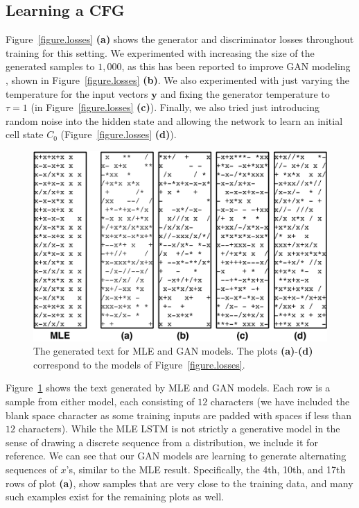 \subsection*{Learning a CFG}
Figure~\ref{figure.losses} \textbf{(a)} shows the generator and discriminator losses throughout training for this setting. We experimented with increasing the size of the generated samples to $1,000$, as this has been reported to improve GAN modeling \cite{huszar2015not}, shown in Figure~\ref{figure.losses} \textbf{(b)}. We also experimented with just varying the temperature for the input vectors $\mathbf{y}$ and fixing the generator temperature to $\tau\!=\!1$ (in Figure~\ref{figure.losses} \textbf{(c)}).  Finally, we also tried just introducing random noise into the hidden state and allowing the network to learn an initial cell state $C_0$ (Figure~\ref{figure.losses} \textbf{(d)}).

\begin{figure}[t!]
\begin{center}
\centerline{\includegraphics[width=\textwidth]{generated.pdf}}
\vspace{-2ex}
\caption{The generated text for MLE and GAN models. The plots \textbf{(a)}-\textbf{(d)} correspond to the models of Figure~\ref{figure.losses}.}
\label{figure.generate}
\end{center}
\end{figure}

Figure~\ref{figure.generate} shows the text generated by MLE and GAN models. Each row is a sample from either model, each consisting of $12$ characters (we have included the blank space character as some training inputs are padded with spaces if less than $12$ characters). While the MLE LSTM is not strictly a generative model in the sense of drawing a discrete sequence from a distribution, we include it for reference. We can see that our GAN models are learning to generate alternating sequences of $x$'s, similar to the MLE result. Specifically, the 4th, 10th, and 17th rows of plot \textbf{(a)}, show samples that are very close to the training data, and many such examples exist for the remaining plots as well. 

